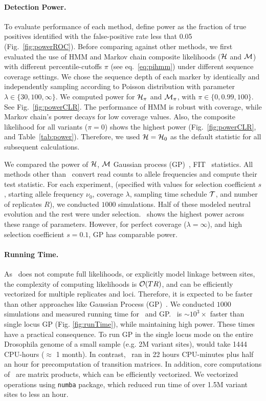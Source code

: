 \documentclass[11pt]{article}
\def\comale{\text{{\sc Comale}}}
\begin{document}
\paragraph{Detection Power.} 
To evaluate performance of each method, define power as the fraction
of true positives identified with the false-positive rate less that
0.05 (Fig.~\ref{fig:powerROC}). Before comparing against other
methods, we first evaluated the use of HMM and Markov chain composite
likelihoods (${\cal H}$ and ${\cal M}$) with different percentile-cutoffs $\pi$
(see eq.~\ref{eq:pihmm}) under different sequence coverage
settings. We chose the sequence depth of each marker by identically
and independently sampling according to Poisson distribution with
parameter $\lambda\in \{30,100,\infty\}$. We computed power for ${\cal
  H}_\pi$ and ${\cal M}_{\pi}$, with $\pi \in \{0,0.99,100\}$. See
Fig.~\ref{fig:powerCLR}. The performance of HMM is robust with
coverage, while Markov chain's power decays for low coverage
values. Also, the composite likelihood for all variants ($\pi=0$)
shows the highest power (Fig.~\ref{fig:powerCLR}, and
Table~\ref{tab:power}).  Therefore, we used ${\cal H} = {\cal H}_0$ as
the default statistic for all subsequent calculations. 

We compared the power of ${\cal H}$, ${\cal M}$ Gaussian process
(GP)~\cite{Terhorst2015Multi}, FIT~\cite{feder2014Identifying}
statistics.  All methods other than \comale\ convert read counts to
allele frequencies and compute their test statistic. For each
experiment, (specified with values for selection coefficient $s$,
starting allele frequency $\nu_0$, coverage $\lambda$, sampling time
schedule ${\cal T}$, and number of replicates $R$), we conducted
$1000$ simulations. Half of these modeled neutral evolution and the
rest were under selection. \comale\ shows the highest power across
these range of parameters. However, for perfect coverage
($\lambda=\infty$), and high selection coefficient $s=0.1$, GP has
comparable power. 




\paragraph{Running Time.}
As \comale\ does not compute full likelihoods, or explicitly model
linkage between sites, the complexity of computing likelihoods is
${\cal O}(TR)$, and can be efficiently vectorized for multiple replicates
and loci. Therefore, it is expected to be faster than other approaches
like Gaussian Process (GP)~\cite{Terhorst2015Multi}. We conducted
$1000$ simulations and measured running time for \comale\ and
GP. \comale\ is $\sim 10^3\times$ faster than single locus GP (Fig.
\ref{fig:runTime}), while maintaining high power. These times have a
practical consequence. To run GP in the
single locus mode on the entire Drosophila genome of a small sample (e.g. 2M 
variant sites),
would take 1444 CPU-hours ($\approx$ 1 month). In contrast, \comale\ ran in 22 
hours CPU-minutes plus half an hour for precomputation of transition matrices. 
In addition, core computations of \comale\ are matrix products, which can be 
efficiently vectorized. We vectorized operations using \texttt{numba} package, 
which reduced run time of over 1.5M variant sites to less an hour.
\end{document}

